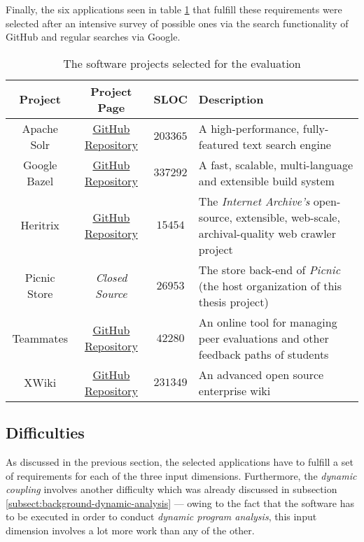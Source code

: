 \documentclass[12pt,a4paper]{report}
\begin{document}
Finally, the six applications seen in table \ref{table:evaluation-projects}
that fulfill these requirements were selected after an intensive survey
of possible ones via the search functionality of GitHub and regular searches via Google.

\begin{table}[ht!]
\def\arraystretch{1.55}
\begin{tabularx}{\textwidth}{|c|c|c|X|}
\hline
Project & Project Page & SLOC & Description \\
\hline\hline

Apache Solr     & \href{https://github.com/apache/lucene-solr}{GitHub Repository} & $203365$ &
A high-performance, fully\hyp featured text search engine \\\hline

Google Bazel    & \href{https://github.com/bazelbuild/bazel}{GitHub Repository} & $337292$ &
A fast, scalable, multi-language and extensible build system \\\hline

Heritrix        & \href{https://github.com/internetarchive/heritrix3}{GitHub Repository} & $15454$ &
The \textit{Internet Archive's} open-source, extensible, web-scale, archival-quality web
crawler project \\\hline

Picnic Store & \textit{Closed Source} & $26953$ &
The store back-end of \textit{Picnic} (the host organization of this thesis project) \\\hline

Teammates       & \href{https://github.com/TEAMMATES/teammates}{GitHub Repository} & $42280$ &
An online tool for managing peer evaluations and other feedback paths of students \\\hline

XWiki           & \href{https://github.com/xwiki/xwiki-platform}{GitHub Repository} & $231349$ &
An advanced open source enterprise wiki \\\hline

\end{tabularx}
\caption{The software projects selected for the evaluation}
\label{table:evaluation-projects}
\end{table}


\subsection{Difficulties} \label{subsect:difficulties}

As discussed in the previous section, the selected applications have to fulfill
a set of requirements for each of the three input dimensions.
Furthermore, the \textit{dynamic coupling} involves another difficulty which
was already discussed in subsection \ref{subsect:background-dynamic-analysis} ---
owing to the fact that the software has to be executed in order to conduct
\textit{dynamic program analysis}, this input dimension involves a lot more work
than any of the other.
\end{document}
